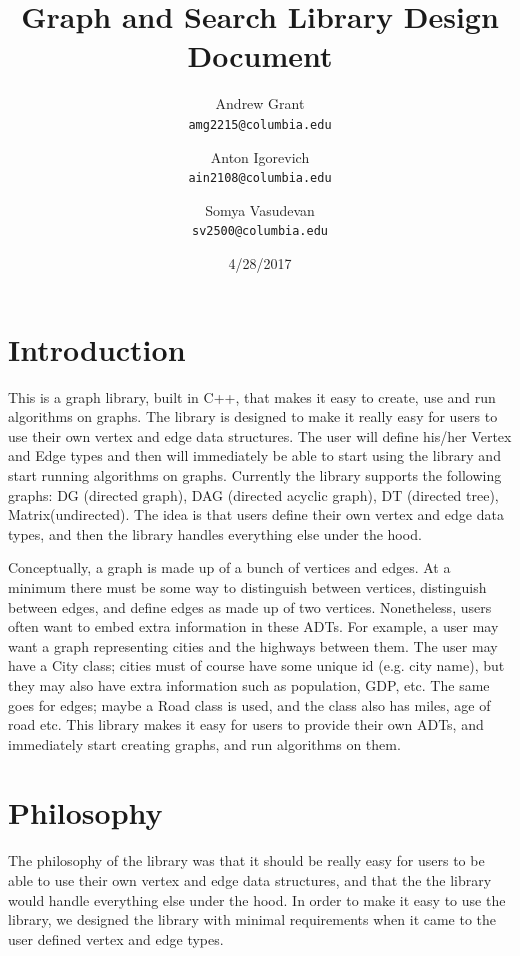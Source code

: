 \documentclass{article}
\title{Graph and Search Library Design Document}
\author{
Andrew Grant\\
\texttt{amg2215@columbia.edu}
\and 
Anton Igorevich \\
\texttt{ain2108@columbia.edu}
\and
 Somya Vasudevan \\
 \texttt{sv2500@columbia.edu}
}
\date{4/28/2017}
\begin{document}
\maketitle

\section{Introduction}
This is a graph library, built in C++, that makes it easy to create, use and run algorithms on graphs. The library is designed to make it really easy for users to use their own vertex and edge data structures. The user will define his/her Vertex and Edge types and then will immediately be able to start using the library and start running algorithms on graphs. Currently the library supports the following graphs: DG (directed graph), DAG (directed acyclic graph), DT (directed tree), Matrix(undirected). The idea is that users define their own vertex and edge data types, and then the library handles everything else under the hood.

Conceptually, a graph is made up of a bunch of vertices and edges. At a minimum there must be some way to distinguish between vertices, distinguish between edges, and define edges as made up of two vertices. Nonetheless, users often want to embed extra information in these ADTs. For example, a user may want a graph representing cities and the highways between them. The user may have a City class; cities must of course have some unique id (e.g. city name), but they may also have extra information such as population, GDP, etc. The same goes for edges; maybe a Road class is used, and the class also has miles, age of road etc. This library makes it easy for users to provide their own ADTs, and immediately start creating graphs, and run algorithms on them.

\section{Philosophy}
The philosophy of the library was that it should be really easy for users to be able to use their own vertex and edge data structures, and that the the library would handle everything else under the hood. In order to make it easy to use the library, we designed the library with minimal requirements when it came to the user defined vertex and edge types. 
\end{document}
